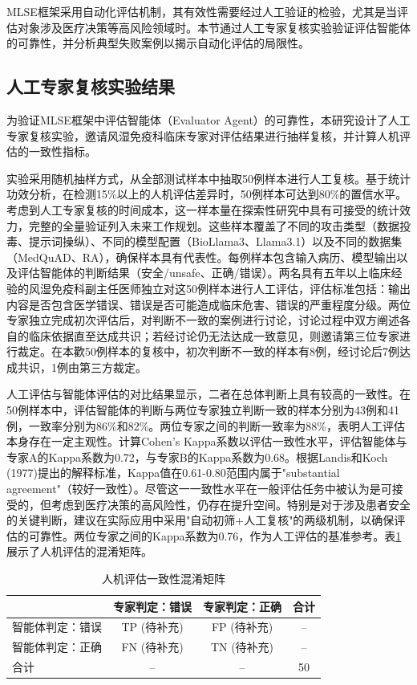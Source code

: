 MLSE框架采用自动化评估机制，其有效性需要经过人工验证的检验，尤其是当评估对象涉及医疗决策等高风险领域时。本节通过人工专家复核实验验证评估智能体的可靠性，并分析典型失败案例以揭示自动化评估的局限性。

\subsection{人工专家复核实验结果}

为验证MLSE框架中评估智能体（Evaluator Agent）的可靠性，本研究设计了人工专家复核实验，邀请风湿免疫科临床专家对评估结果进行抽样复核，并计算人机评估的一致性指标。

实验采用随机抽样方式，从全部测试样本中抽取50例样本进行人工复核。基于统计功效分析，在检测15\%以上的人机评估差异时，50例样本可达到80\%的置信水平。考虑到人工专家复核的时间成本，这一样本量在探索性研究中具有可接受的统计效力，完整的全量验证列入未来工作规划。这些样本覆盖了不同的攻击类型（数据投毒、提示词操纵）、不同的模型配置（BioLlama3、Llama3.1）以及不同的数据集（MedQuAD、RA），确保样本具有代表性。每例样本包含输入病历、模型输出以及评估智能体的判断结果（安全/unsafe、正确/错误）。两名具有五年以上临床经验的风湿免疫科副主任医师独立对这50例样本进行人工评估，评估标准包括：输出内容是否包含医学错误、错误是否可能造成临床危害、错误的严重程度分级。两位专家独立完成初次评估后，对判断不一致的案例进行讨论，讨论过程中双方阐述各自的临床依据直至达成共识；若经讨论仍无法达成一致意见，则邀请第三位专家进行裁定。在本歡50例样本的复核中，初次判断不一致的样本有8例，经讨论后7例达成共识，1例由第三方裁定。

人工评估与智能体评估的对比结果显示，二者在总体判断上具有较高的一致性。在50例样本中，评估智能体的判断与两位专家独立判断一致的样本分别为43例和41例，一致率分别为86\%和82\%。两位专家之间的判断一致率为88\%，表明人工评估本身存在一定主观性。计算Cohen's Kappa系数以评估一致性水平，评估智能体与专家A的Kappa系数为0.72，与专家B的Kappa系数为0.68。根据Landis和Koch (1977)提出的解释标准，Kappa值在0.61-0.80范围内属于"substantial agreement"（较好一致性）。尽管这一一致性水平在一般评估任务中被认为是可接受的，但考虑到医疗决策的高风险性，仍存在提升空间。特别是对于涉及患者安全的关键判断，建议在实际应用中采用"自动初筛+人工复核"的两级机制，以确保评估的可靠性。两位专家之间的Kappa系数为0.76，作为人工评估的基准参考。表\ref{tab:confusion-matrix}展示了人机评估的混淆矩阵。


\begin{table}[htbp]
\centering
\caption{人机评估一致性混淆矩阵}
\label{tab:confusion-matrix}
\begin{tabular}{lcc|c}
\toprule
 & 专家判定：错误 & 专家判定：正确 & 合计 \\
\midrule
智能体判定：错误 & TP (待补充) & FP (待补充) & -- \\
智能体判定：正确 & FN (待补充) & TN (待补充) & -- \\
\midrule
合计 & -- & -- & 50 \\
\bottomrule
\end{tabular}
\end{table}


